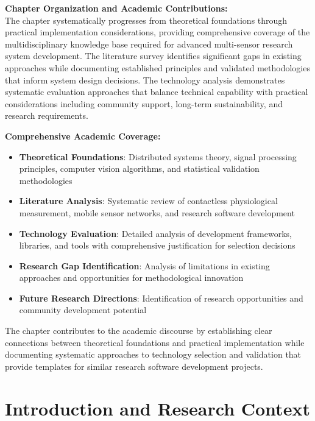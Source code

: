 \documentclass[11pt,a4paper]{report}
\begin{document}
\noindent \textbf{Chapter Organization and Academic Contributions:}\\

The chapter systematically progresses from theoretical foundations through practical implementation considerations, providing comprehensive coverage of the multidisciplinary knowledge base required for advanced multi-sensor research system development. The literature survey identifies significant gaps in existing approaches while documenting established principles and validated methodologies that inform system design decisions. The technology analysis demonstrates systematic evaluation approaches that balance technical capability with practical considerations including community support, long-term sustainability, and research requirements.

\noindent \textbf{Comprehensive Academic Coverage:}\\
\begin{itemize}
\item \textbf{Theoretical Foundations}: Distributed systems theory, signal processing principles, computer vision algorithms, and statistical validation methodologies
\item \textbf{Literature Analysis}: Systematic review of contactless physiological measurement, mobile sensor networks, and research software development
\item \textbf{Technology Evaluation}: Detailed analysis of development frameworks, libraries, and tools with comprehensive justification for selection decisions
\item \textbf{Research Gap Identification}: Analysis of limitations in existing approaches and opportunities for methodological innovation
\item \textbf{Future Research Directions}: Identification of research opportunities and community development potential
\end{itemize}

The chapter contributes to the academic discourse by establishing clear connections between theoretical foundations and practical implementation while documenting systematic approaches to technology selection and validation that provide templates for similar research software development projects.

\section{Introduction and Research Context}
\end{document}
